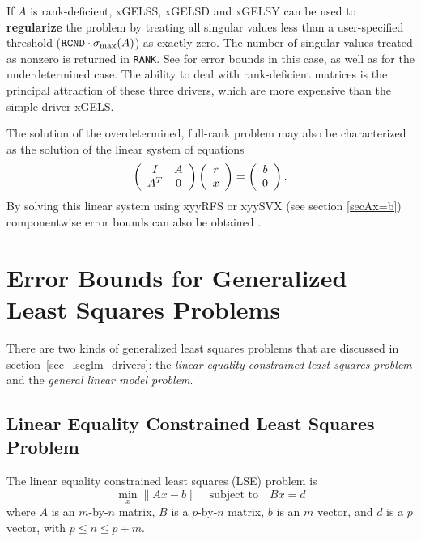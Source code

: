 If $A$ is rank-deficient, xGELSS, xGELSD and xGELSY can be used to
{\bf regularize} the
problem
by treating all singular values
less than a user-specified threshold
(${\tt RCND} \cdot \sigma_{\max} (A)$) as
exactly zero.  The number of singular values treated as nonzero is returned
in {\tt RANK}.  See \cite{bjorck3,GVL2,higham02}
for error bounds in this case, as well as
\cite{demmelhigham1} for the
underdetermined
 case.
The ability to deal with rank-deficient matrices is the principal attraction
of these three drivers, which are more expensive than the simple driver xGELS.

The solution of the overdetermined,
full-rank problem may also be
characterized as the solution of the linear system of equations
\[
\bmat{cc} I & A \\ A^T & 0 \emat \bmat{c} r \\ x \emat =
\bmat{c} b \\ 0 \emat.
\]
By solving this linear system using xyyRFS or xyySVX (see section
\ref{secAx=b}) componentwise error bounds can also be obtained
\cite{arioliduffderijk}.

\section{Error Bounds for Generalized Least Squares Problems}\label{secEbndGLSQ}
\label{sec_lseglm_drivers}

There are two kinds of generalized least squares problems that are
discussed in section~\ref{sec_lseglm_drivers}:
the {\em linear equality constrained
least squares problem} and the {\em general linear model problem}.

\subsection{Linear Equality Constrained Least Squares Problem}

The linear equality constrained least squares (LSE) problem is
$$      \min_x \| Ax - b \| \quad \mbox{subject to} \quad Bx = d   $$
where $A$ is an $m$-by-$n$ matrix, $B$ is a $p$-by-$n$ matrix,
$b$ is an $m$ vector, and $d$ is a $p$ vector, with $p \leq n \leq p+m$. \\

